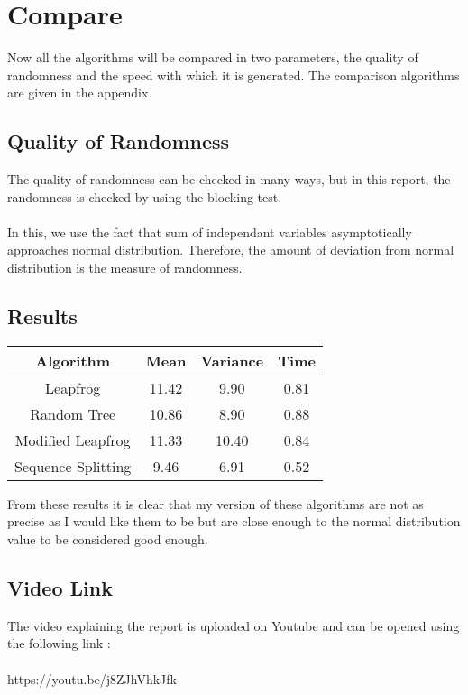 \chapter{Compare}
Now all the algorithms will be compared in two parameters, 
the quality of randomness and the speed with which it is 
generated. The comparison algorithms are given in the appendix.

\section{Quality of Randomness}
The quality of randomness can be checked in many ways, but in 
this report, the randomness is checked by using the blocking 
test.
\\\\
In this, we use the fact that sum of independant variables 
asymptotically approaches normal distribution. Therefore, 
the amount of deviation from normal distribution is the 
measure of randomness.

\section{Results}

\begin{center}
    \begin{tabular}{||c c c c||} 
    \hline
    Algorithm & Mean & Variance & Time \\ [0.5ex] 
    \hline\hline
    Leapfrog & 11.42 & 9.90 & 0.81\\ 
    \hline
    Random Tree & 10.86 & 8.90 & 0.88 \\
    \hline
    Modified Leapfrog & 11.33 & 10.40 & 0.84 \\
    \hline
    Sequence Splitting & 9.46 & 6.91 & 0.52 \\
    \hline
   \end{tabular}
   \end{center}

\noindent From these results it is clear that my version 
of these algorithms are not as precise as I would like them to 
be but are close enough to the normal distribution value to 
be considered good enough.

\section{Video Link}
The video explaining the report is uploaded on Youtube and can 
be opened using the following link :
\\\\
https://youtu.be/j8ZJhVhkJfk